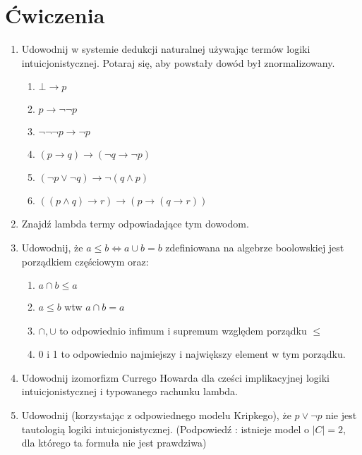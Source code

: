 \documentclass{article}
\begin{document}
\section{Ćwiczenia}

\begin{enumerate}

	\item Udowodnij w systemie dedukcji naturalnej używając termów logiki intuicjonistycznej. Potaraj się, aby powstały dowód był znormalizowany.
	\begin{enumerate}
 \item \( \bot \rightarrow p\)
 \item \( p \rightarrow \neg \neg p \)
 \item \( \neg \neg \neg p \rightarrow \neg p\)
 \item \( (p \rightarrow q) \rightarrow (\neg q \rightarrow \neg p ) \)
 \item \( (\neg p \vee \neg q) \rightarrow \neg ( q \wedge p ) \)
 \item \( (( p \wedge q) \rightarrow r) \rightarrow ( p \rightarrow ( q \rightarrow r )) \)
\end{enumerate}
	\item Znajdź lambda termy odpowiadające tym dowodom. 
	\item Udowodnij,  że \( a \leq b \Leftrightarrow a \cup b = b\) zdefiniowana na algebrze boolowskiej jest porządkiem częściowym oraz: 
	\begin{enumerate}
	\item \( a \cap b  \leq a\)
	\item \( a \leq b\) wtw \( a \cap b = a\)
	\item \( \cap , \cup\) to odpowiednio infimum i supremum względem porządku \( \leq\) 
	\item  0 i 1 to odpowiednio najmiejszy i największy element w tym porządku.
	\end{enumerate}
	\item Udowodnij izomorfizm Currego Howarda dla cześci implikacyjnej logiki intuicjonistycznej i typowanego rachunku lambda.
	\item Udowodnij (korzystając z odpowiednego modelu Kripkego), że \( p \vee \neg p \) nie jest tautologią logiki intuicjonistycznej. (Podpowiedź : istnieje model o \( |C| = 2\), dla którego ta formuła nie jest prawdziwa)
\end{enumerate}
\end{document}

